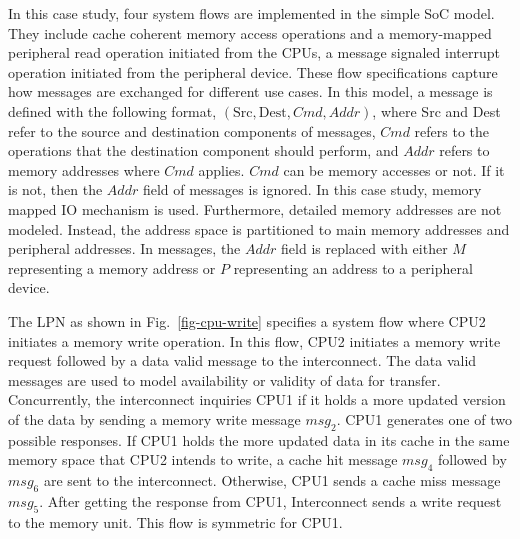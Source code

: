 \documentclass[conference]{IEEEtran}
\begin{document}
In this case study, four system flows are implemented in the simple SoC model. They include cache coherent memory access operations and a memory-mapped peripheral read operation initiated from the CPUs, a message signaled interrupt operation initiated from the peripheral device.  These flow specifications capture how messages are exchanged for different use cases.  In this model, a message is defined with the following format, $(\mbox{Src}, \mbox{Dest}, \mathit{Cmd}, \mathit{Addr})$, where Src and Dest refer to the source and destination components of messages, $\mathit{Cmd}$ refers to the operations that the destination component should perform, and $\mathit{Addr}$ refers to memory addresses where $\mathit{Cmd}$ applies.  $\mathit{Cmd}$ can be memory accesses or not.  If it is not, then the $\mathit{Addr}$ field of messages is ignored.  In this case study, memory mapped IO mechanism is used.  Furthermore, detailed memory addresses are not modeled. Instead, the address space is partitioned to main memory addresses and peripheral addresses.  In messages, the $\mathit{Addr}$ field is replaced with either $M$ representing a memory address or $P$ representing an address to a peripheral device.  

The LPN as shown in Fig.~\ref{fig-cpu-write} specifies a system flow where {CPU2} initiates a memory write operation.   In this flow, CPU2 initiates a memory write request followed by a data valid message to the interconnect.  The data valid messages are used to model availability or validity of data for transfer.  Concurrently, the interconnect inquiries CPU1 if it holds a more updated version of the data by sending a memory write message $\mathit{msg_2}$.   CPU1 generates one of two possible responses.  If CPU1 holds the more updated data in its cache in the same memory space that CPU2 intends to write, a cache hit message $\mathit{msg_4}$ followed by $\mathit{msg_6}$ are sent to the interconnect.  Otherwise, CPU1 sends a cache miss message $\mathit{msg_5}$.  After getting the response from CPU1, Interconnect sends a write request to the memory unit.  This flow is symmetric for CPU1.
\end{document}

